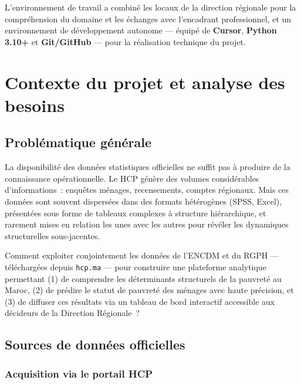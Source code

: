 \documentclass[12pt,a4paper]{report}
\begin{document}
L'environnement de travail a combiné les locaux de la direction régionale pour la compréhension du domaine et les échanges avec l'encadrant professionnel, et un environnement de développement autonome --- équipé de \textbf{Cursor}, \textbf{Python 3.10+} et \textbf{Git/GitHub} --- pour la réalisation technique du projet.

\chapter{Contexte du projet et analyse des besoins}

\section{Problématique générale}

La disponibilité des données statistiques officielles ne suffit pas à produire de la connaissance opérationnelle. Le HCP génère des volumes considérables d'informations~: enquêtes ménages, recensements, comptes régionaux. Mais ces données sont souvent dispersées dans des formats hétérogènes (SPSS, Excel), présentées sous forme de tableaux complexes à structure hiérarchique, et rarement mises en relation les unes avec les autres pour révéler les dynamiques structurelles sous-jacentes.

\begin{infobox}
Comment exploiter conjointement les données de l'ENCDM et du RGPH --- téléchargées depuis \texttt{hcp.ma} --- pour construire une plateforme analytique permettant (1) de comprendre les déterminants structurels de la pauvreté au Maroc, (2) de prédire le statut de pauvreté des ménages avec haute précision, et (3) de diffuser ces résultats via un tableau de bord interactif accessible aux décideurs de la Direction Régionale~?
\end{infobox}

\section{Sources de données officielles}

\subsection{Acquisition via le portail HCP}
\end{document}
